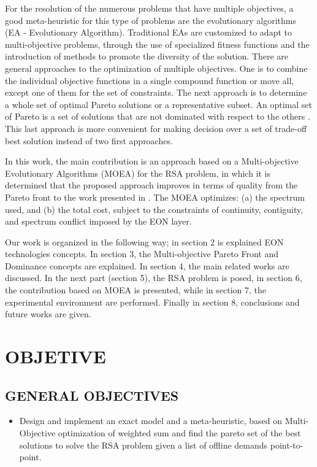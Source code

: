 For the resolution of the numerous problems that have multiple objectives,
a good meta-heuristic for this type of problems are the evolutionary
algorithms (EA - Evolutionary Algorithm). Traditional EAs are customized
to adapt to multi-objective problems, through the use of specialized
fitness functions and the introduction of methods to promote the diversity
of the solution. There are general approaches to the optimization
of multiple objectives. One is to combine the individual objective
functions in a single compound function or move all, except one of
them for the set of constraints. The next approach is to determine
a whole set of optimal Pareto solutions or a representative subset.
An optimal set of Pareto is a set of solutions that are not dominated
with respect to the others \cite{moga-rsa-dao}. This last approach
is more convenient for making decision over a set of trade-off best
solution instead of two first approaches. 

In this work, the main contribution is an approach based on a Multi-objective
Evolutionary Algorithms (MOEA) for the RSA problem, in which it is
determined that the proposed approach improves in terms of quality
from the Pareto front to the work presented in \cite{moga-rsa-dao}.
The MOEA optimizes: (a) the spectrum used, and (b) the total cost,
subject to the constraints of continuity, contiguity, and spectrum
conflict imposed by the EON layer. 

Our work is organized in the following way; in section 2 is explained
EON technologies concepts. In section 3, the Multi-objective Pareto
Front and Dominance concepts are explained. In section 4, the main
related works are discussed. In the next part (section 5), the RSA
problem is posed, in section 6, the contribution based on MOEA is
presented, while in section 7, the experimental environment are performed.
Finally in section 8, conclusions and future works are given. 

\section{OBJETIVE }

\subsection{GENERAL OBJECTIVES}
\begin{itemize}
\item Design and implement an exact model and a meta-heuristic, based on
Multi-Objective optimization of weighted sum and find the pareto set
of the best solutions to solve the RSA problem given a list of offline
demands point-to-point.
\end{itemize}

